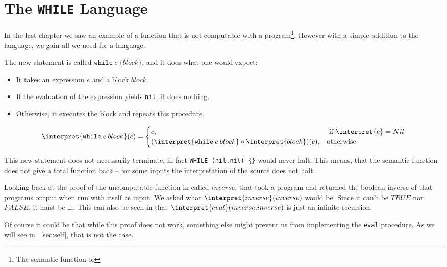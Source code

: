 \section{The {\tt WHILE} Language}
\label{sec:WHILE}
In the last chapter we saw an example of a function that is not computable 
with a \FOR program\footnote{The semantic function of \FOR}. However with a 
simple addition to the language, we gain all we need for a language.

The new statement is called $\mathtt{while}\: e\: \{ block \}$, and it does what one would expect:

\begin{itemize}
	\item It takes an expression $e$ and a block $block$.
	\item If the evaluation of the expression yields {\tt nil}, it does nothing.
	\item Otherwise, it executes the block and repeats this procedure.
\end{itemize}

\begin{equation}
	\interpret{\mathtt{while}\: e\: block}(c) = \begin{cases}
		c, &\text{ if }\interpret{e}=Nil\\
		(\interpret{\mathtt{while}\: e\: block} \circ \interpret{block})(c), &\text{otherwise}
	\end{cases}
\end{equation}

This new statement does not necessarily terminate, in fact {\tt WHILE 
(nil.nil) \{\}} would never halt. This means, that the semantic function 
does not give a total function back -- for some inputs the interpretation of 
the source does not halt.

Looking back at the proof of the uncomputable function in \FOR called
$inverse$, that took a program and returned the boolean inverse of that
programs output when run with itself as input. We asked what
$\interpret{inverse}(inverse)$ would be. Since it can't be $TRUE$ nor
$FALSE$, it must be $\bot$. This can also be seen in that
$\interpret{eval}(inverse.inverse)$ is just an infinite recursion. 

Of course it could be that while this proof does not work, something else might
prevent us from implementing the {\tt eval} procedure. As we will see in
~\ref{sec:self}, that is not the case.
